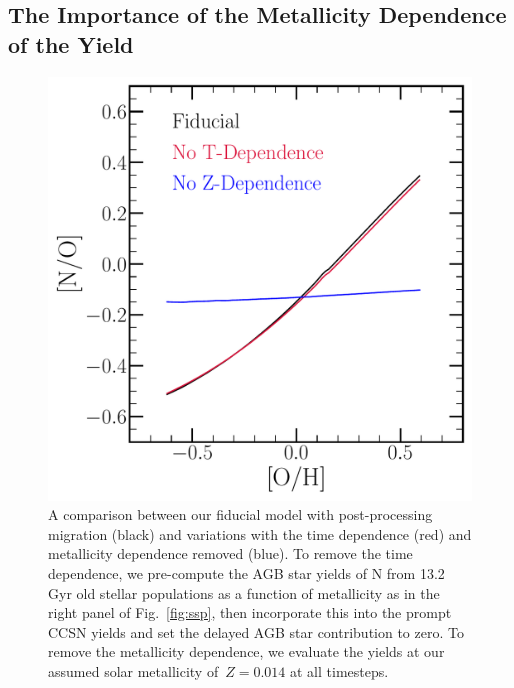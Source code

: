 \documentclass[ms.tex]{subfiles}
\begin{document}
\subsection{The Importance of the Metallicity Dependence of the Yield}
\label{sec:results:t_z_dep_comp}

\begin{figure}
\centering
\includegraphics[scale = 0.45]{t_z_dep_comp.pdf}
\caption{
A comparison between our fiducial model with post-processing migration (black)
and variations with the time dependence (red) and metallicity dependence 
removed (blue).
To remove the time dependence, we pre-compute the AGB star yields of N from
13.2 Gyr old stellar populations as a function of metallicity as in the right
panel of Fig.~\ref{fig:ssp}, then incorporate this into the prompt CCSN yields
and set the delayed AGB star contribution to zero.
To remove the metallicity dependence, we evaluate the yields at our assumed
solar metallicity of~$Z = 0.014$ at all timesteps.
}
\label{fig:t_z_dep_comp}
\end{figure}
\end{document}
